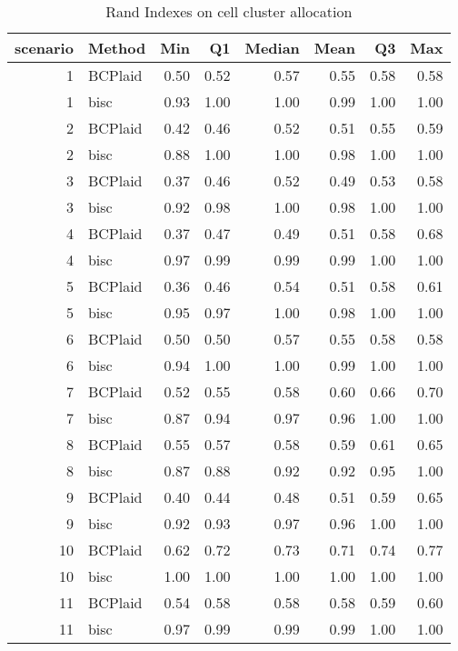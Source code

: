 \begin{table}[ht]
\caption{Rand Indexes on cell cluster allocation}
\vspace{1.5cm}
\centering
\begin{tabular}{rlrrrrrr}
  \toprule
scenario & Method & Min & Q1 & Median & Mean & Q3 & Max \\ 
  \midrule
  1 & BCPlaid & 0.50 & 0.52 & 0.57 & 0.55 & 0.58 & 0.58 \\ 
    1 & bisc & 0.93 & 1.00 & 1.00 & 0.99 & 1.00 & 1.00 \\ 
    2 & BCPlaid & 0.42 & 0.46 & 0.52 & 0.51 & 0.55 & 0.59 \\ 
    2 & bisc & 0.88 & 1.00 & 1.00 & 0.98 & 1.00 & 1.00 \\ 
    3 & BCPlaid & 0.37 & 0.46 & 0.52 & 0.49 & 0.53 & 0.58 \\ 
    3 & bisc & 0.92 & 0.98 & 1.00 & 0.98 & 1.00 & 1.00 \\ 
    4 & BCPlaid & 0.37 & 0.47 & 0.49 & 0.51 & 0.58 & 0.68 \\ 
    4 & bisc & 0.97 & 0.99 & 0.99 & 0.99 & 1.00 & 1.00 \\ 
    5 & BCPlaid & 0.36 & 0.46 & 0.54 & 0.51 & 0.58 & 0.61 \\ 
    5 & bisc & 0.95 & 0.97 & 1.00 & 0.98 & 1.00 & 1.00 \\ 
    6 & BCPlaid & 0.50 & 0.50 & 0.57 & 0.55 & 0.58 & 0.58 \\ 
    6 & bisc & 0.94 & 1.00 & 1.00 & 0.99 & 1.00 & 1.00 \\ 
    7 & BCPlaid & 0.52 & 0.55 & 0.58 & 0.60 & 0.66 & 0.70 \\ 
    7 & bisc & 0.87 & 0.94 & 0.97 & 0.96 & 1.00 & 1.00 \\ 
    8 & BCPlaid & 0.55 & 0.57 & 0.58 & 0.59 & 0.61 & 0.65 \\ 
    8 & bisc & 0.87 & 0.88 & 0.92 & 0.92 & 0.95 & 1.00 \\ 
    9 & BCPlaid & 0.40 & 0.44 & 0.48 & 0.51 & 0.59 & 0.65 \\ 
    9 & bisc & 0.92 & 0.93 & 0.97 & 0.96 & 1.00 & 1.00 \\ 
   10 & BCPlaid & 0.62 & 0.72 & 0.73 & 0.71 & 0.74 & 0.77 \\ 
   10 & bisc & 1.00 & 1.00 & 1.00 & 1.00 & 1.00 & 1.00 \\ 
   11 & BCPlaid & 0.54 & 0.58 & 0.58 & 0.58 & 0.59 & 0.60 \\ 
   11 & bisc & 0.97 & 0.99 & 0.99 & 0.99 & 1.00 & 1.00 \\ 

\end{tabular}
\end{table}

